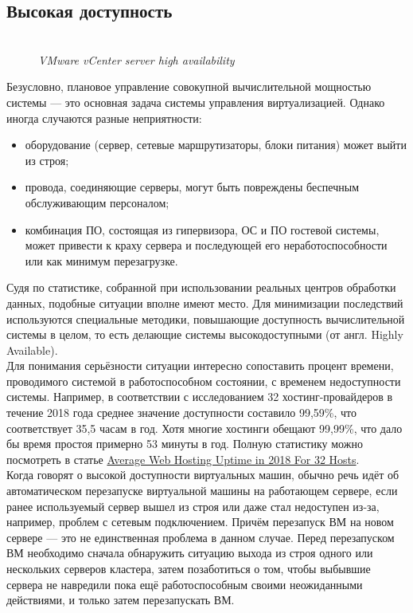 \documentclass[14pt, a4paper]{article}
\begin{document}
\subsection*{Высокая доступность} 

\begin{figure}[h]
    \centering
    \\ 
    \small\textit{VMware vCenter server high availability}  
    \label{framework} 
\end{figure}

Безусловно, плановое управление совокупной вычислительной мощностью системы — это основная
задача системы управления виртуализацией. Однако иногда случаются разные неприятности:

\begin{itemize}
    \item оборудование (сервер, сетевые маршрутизаторы, блоки питания) может выйти из строя;
    \item провода, соединяющие серверы, могут быть повреждены беспечным обслуживающим
    персоналом;
    \item комбинация ПО, состоящая из гипервизора, ОС и ПО гостевой системы, может привести к
    краху сервера и последующей его неработоспособности или как минимум перезагрузке.
\end{itemize}

Судя по статистике, собранной при использовании реальных центров обработки данных, подобные
ситуации вполне имеют место. Для минимизации последствий используются специальные методики,
повышающие доступность вычислительной системы в целом, то есть делающие системы
высокодоступными (от англ. Highly Available).\\

Для понимания серьёзности ситуации интересно сопоставить процент времени, проводимого
системой в работоспособном состоянии, с временем недоступности системы. Например, в
соответствии с исследованием 32 хостинг-провайдеров в течение 2018 года среднее значение
доступности составило 99,59\%, что соответствует 35,5 часам в год. Хотя многие хостинги обещают
99,99\%, что дало бы время простоя примерно 53 минуты в год. Полную статистику можно посмотреть
в статье \href{https://hostingfacts.com/average-hosting-uptime-study/}{Average Web Hosting Uptime in 2018 For 32 Hosts}.\\

Когда говорят о высокой доступности виртуальных машин, обычно речь идёт об автоматическом
перезапуске виртуальной машины на работающем сервере, если ранее используемый сервер вышел
из строя или даже стал недоступен из-за, например, проблем с сетевым подключением. Причём
перезапуск ВМ на новом сервере — это не единственная проблема в данном случае. Перед
перезапуском ВМ необходимо сначала обнаружить ситуацию выхода из строя одного или нескольких
серверов кластера, затем позаботиться о том, чтобы выбывшие сервера не навредили пока ещё
работоспособным своими неожиданными действиями, и только затем перезапускать ВМ.\\
\end{document}
